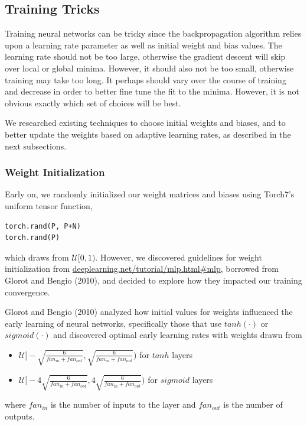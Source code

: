 \documentclass[11pt]{article}
\begin{document}
\subsection{Training Tricks}

Training neural networks can be tricky since the backpropagation algorithm relies upon a learning rate parameter as well as initial weight and bias values. The learning rate should not be too large, otherwise the gradient descent will skip over local or global minima. However, it should also not be too small, otherwise training may take too long. It perhaps should vary over the course of training and decrease in order to better fine tune the fit to the minima. However, it is not obvious exactly which set of choices will be best.

We researched existing techniques to choose initial weights and biases, and to better update the weights based on adaptive learning rates, as described in the next subsections.

\subsubsection{Weight Initialization}\label{Weights}

Early on, we randomly initialized our weight matrices and biases using Torch7's uniform tensor function,
\begin{lstlisting}
torch.rand(P, P+N)
torch.rand(P)
\end{lstlisting}
which draws from $\mathcal{U}[0, 1)$. However, we discovered guidelines for weight initialization from \hyperlink{http://deeplearning.net/tutorial/mlp.html\#mlp}{deeplearning.net/tutorial/mlp.html\#mlp}, borrowed from Glorot and Bengio (2010), and decided to explore how they impacted our training convergence.

Glorot and Bengio (2010) analyzed how initial values for weights influenced the early learning of neural networks, specifically those that use $tanh(\cdot)$ or $sigmoid(\cdot)$ and discovered optimal early learning rates with weights drawn from
\begin{itemize}
\item $\mathcal{U}\Big[-\sqrt{\frac{6}{fan_{in}+fan_{out}}},\sqrt{\frac{6}{fan_{in}+fan_{out}}}\Big)$ for $tanh$ layers
\item $\mathcal{U}\Big[-4\sqrt{\frac{6}{fan_{in}+fan_{out}}},4\sqrt{\frac{6}{fan_{in}+fan_{out}}}\Big)$ for $sigmoid$ layers
\end{itemize}
where $fan_{in}$ is the number of inputs to the layer and $fan_{out}$ is the number of outputs.
\end{document}
